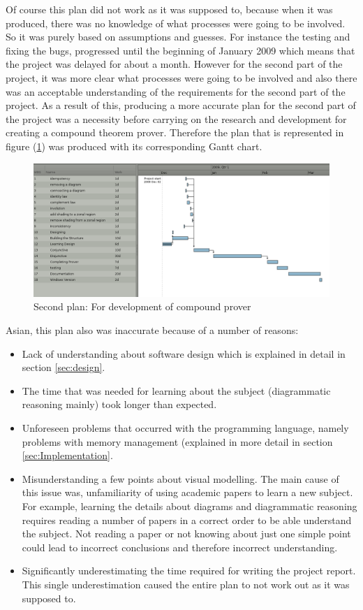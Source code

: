 \documentclass[10pt, a4paper, titlepage]{article}
\begin{document}
Of course this plan did not work as it was supposed to, because when it was produced, there was no knowledge of what processes were going to be involved. So it was purely based on assumptions and guesses. For instance the testing and fixing the bugs, progressed until the beginning of January 2009 which means that the project was delayed for about a month. However for the second part of the project, it was more clear what processes were going to be involved and also there was an acceptable understanding of the requirements for the second part of the project. As a result of this, producing a more accurate plan for the second part of the project was a necessity before carrying on the research and development for creating a compound theorem prover. Therefore the plan that is represented in figure (\ref{fig:plan}) was produced with its corresponding Gantt chart.

\begin{figure}[]
\centering
\includegraphics[angle = 90, scale=0.55]{images/plan.png}
\caption{Second plan: For development of compound prover}
\label{fig:plan}
\end{figure} 

Asian, this plan also was inaccurate because of a number of reasons:

\begin{itemize}
\item Lack of understanding about software design which is explained in detail in section \ref{sec:design}.
\item The time that was needed for learning about the subject (diagrammatic reasoning mainly) took longer than expected.
\item Unforeseen problems that occurred with the programming language, namely problems with memory management (explained in more detail in section \ref{sec:Implementation}.
\item Misunderstanding a few points about visual modelling. The main cause of this issue was, unfamiliarity of using academic papers to learn a new subject. For example, learning the details about diagrams and diagrammatic reasoning requires reading a number of papers in a correct order to be able understand the subject. Not reading a paper or not knowing about just one simple point could lead to incorrect conclusions and therefore incorrect understanding. 
\item Significantly underestimating the time required for writing the project report. This single underestimation caused the entire plan to not work out as it was supposed to.
\end{itemize}
\end{document}
